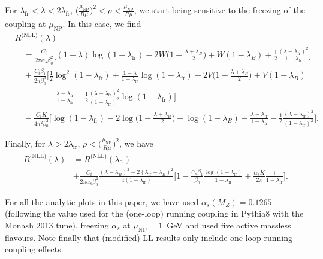 For $\lambda_\text{fr}<\lambda<2\lambda_\text{fr}$, \ie
$\big(\tfrac{\mu_\text{NP}}{R\mu}\big)^2<\rho<\tfrac{\mu_\text{NP}}{R\mu}$,
we start being sensitive to the freezing of the coupling at
$\mu_\text{NP}$. In this case, we find
\begin{align}
  &R^\text{(NLL)}(\lambda)\\
  &\quad = \frac{C_i}{2\pi\alpha_s\beta_0^2}\Big[
    (1-\lambda)\log(1-\lambda_\text{fr})-2W\big(1-\frac{\lambda+\lambda_B}{2}\big)+W(1-\lambda_B)+\frac{1}{2}\frac{(\lambda-\lambda_\text{fr})^2}{1-\lambda_\text{fr}}
    \Big]\nonumber\\
  &\quad +\frac{C_i\beta_1}{2\pi\beta_0^3}\Big[
    \frac{1}{2}\log^2(1-\lambda_\text{fr})+\frac{1-\lambda}{1-\lambda_\text{fr}}\log(1-\lambda_\text{fr})-2V\big(1-\frac{\lambda+\lambda_B}{2}\big)+V(1-\lambda_B)\nonumber\\
  &\quad\phantom{+\frac{C_i\beta_1}{2\pi\beta_0^3}\Big[}
    -\frac{\lambda-\lambda_\text{fr}}{1-\lambda_\text{fr}}-\frac{1}{2}\frac{(\lambda-\lambda_\text{fr})^2}{(1-\lambda_\text{fr})^2}\log(1-\lambda_\text{fr})
    \Big]\nonumber\\
  &\quad -\frac{C_iK}{4\pi^2\beta_0^2}\Big[
    \log(1-\lambda_\text{fr})-2\log\big(1-\frac{\lambda+\lambda_B}{2}\big)+\log(1-\lambda_B)-\frac{\lambda-\lambda_\text{fr}}{1-\lambda_\text{fr}}-\frac{1}{2}\frac{(\lambda-\lambda_\text{fr})^2}{(1-\lambda_\text{fr})^2}
    \Big].\nonumber
\end{align}

Finally, for $\lambda>2\lambda_\text{fr}$, \ie
$\rho<\big(\tfrac{\mu_\text{NP}}{R\mu}\big)^2$, we have
\begin{align}
  R^\text{(NLL)}(\lambda)
  & = R^\text{(NLL)}(\lambda_\text{fr})\\
  & + \frac{C_i}{2\pi\alpha_s\beta_0^2}
    \frac{(\lambda-\lambda_B)^2-2(\lambda_\text{fr}-\lambda_B)^2}{4(1-\lambda_\text{fr})}
    \Big[
    1-\frac{\alpha_s\beta_1}{\beta_0}\frac{\log(1-\lambda_\text{fr})}{1-\lambda_\text{fr}}
    +\frac{\alpha_s K}{2\pi}\frac{1}{1-\lambda_\text{fr}}
    \Big].\nonumber
\end{align}

For all the analytic plots in this paper, we have used
$\alpha_s(M_Z)=0.1265$ (following the value used for the (one-loop)
running coupling in Pythia8 with the Monash 2013 tune), freezing
$\alpha_s$ at $\mu_\text{NP}=1$~GeV and used five active massless
flavours. 
%
Note finally that (modified)-LL results only include one-loop running
coupling effects.




